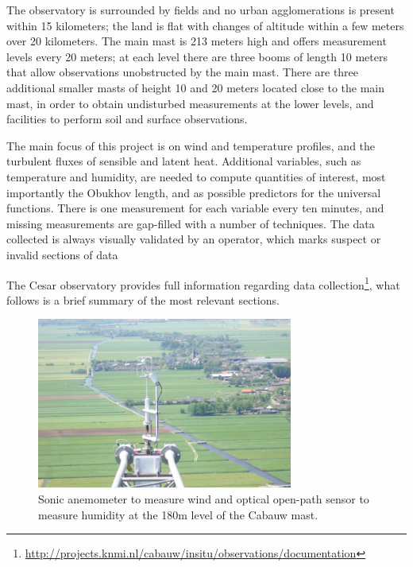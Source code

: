 \documentclass[12pt]{book}
\begin{document}
The observatory is surrounded by fields and no urban agglomerations is present within 15 kilometers; the land is flat with changes of altitude within a few meters over 20 kilometers. The main mast is 213 meters high and offers measurement levels every 20 meters; at each level there are three booms of length 10 meters that allow observations unobstructed by the main mast. There are three additional smaller masts of height 10 and 20 meters located close to the main mast, in order to obtain undisturbed measurements at the lower levels, and facilities to perform soil and surface observations.

The main focus of this project is on wind and temperature profiles, and the turbulent fluxes of sensible and latent heat. Additional variables, such as temperature and humidity, are needed to compute quantities of interest, most importantly the Obukhov length, and as possible predictors for the universal functions. There is one measurement for each variable every ten minutes, and missing measurements are gap-filled with a number of techniques. The data collected is always visually validated by an operator, which marks suspect or invalid sections of data

The Cesar observatory provides full information regarding data collection\footnote{\url{http://projects.knmi.nl/cabauw/insitu/observations/documentation}}, what follows is a brief summary of the most relevant sections.


\begin{figure}
\caption{Sonic anemometer to measure wind and optical open-path sensor to measure humidity at the 180m level of the Cabauw mast.}
\label{fig:bl}
\centering
\includegraphics[width=0.75\textwidth]{images/cabauw_turbulence_instruments}
\end{figure}
\end{document}
